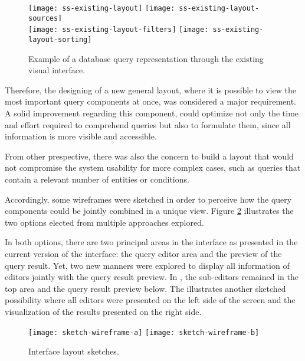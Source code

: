 \begin{figure}[tb]
    \centering
      {\texttt{[image: ss-existing-layout]}}%
      {\texttt{[image: ss-existing-layout-sources]}}%
      \\
    {\texttt{[image: ss-existing-layout-filters]}}%
    {\texttt{[image: ss-existing-layout-sorting]}}%
  \caption{Example of a database query representation through the existing visual interface.}
    \label{fig:example_of_query_representation}
\end{figure}

Therefore, the designing of a new general layout, where it is possible to view the most important query components at once, was considered a major requirement. A solid improvement regarding this component, could optimize not only the time and effort required to comprehend queries but also to formulate them, since all information is more visible and accessible.

From other prespective, there was also the concern to build a layout that would not compromise the system usability for more complex cases, such as queries that contain a relevant number of entities or conditions.

Accordingly, some wireframes were sketched in order to perceive how the query components could be jointly combined in a unique view. Figure \ref{fig:sketch_wireframes} illustrates the two options elected from multiple approaches explored.

In both options, there are two principal areas in the interface as presented in the current version of the interface: the query editor area and the preview of the query result. Yet, two new manners were explored to display all information of editors jointly with the query result preview. In , the sub-editors remained in the top area and the query result preview below. The  illustrates another sketched possibility where all editors were presented on the left side of the screen and the visualization of the results presented on the right side.

\begin{figure}[tb]
  \centering
    {\texttt{[image: sketch-wireframe-a]}}%
  {\texttt{[image: sketch-wireframe-b]}}%
\caption{Interface layout sketches.}
  \label{fig:sketch_wireframes}
\end{figure}

